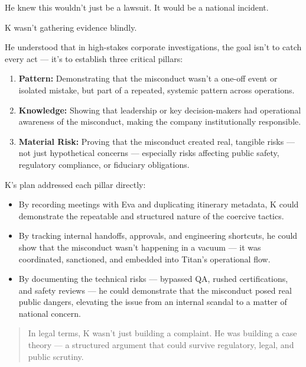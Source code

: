He knew this wouldn’t just be a lawsuit.  It would be a national incident.

K wasn’t gathering evidence blindly.

He understood that in high-stakes corporate investigations, the goal isn’t to catch every act — it’s to establish three critical pillars:

\begin{enumerate}
    \item \textbf{Pattern:}  
    Demonstrating that the misconduct wasn’t a one-off event or isolated mistake,  
    but part of a repeated, systemic pattern across operations.
    
    \item \textbf{Knowledge:}  
    Showing that leadership or key decision-makers had operational awareness of the misconduct,  
    making the company institutionally responsible.
    
    \item \textbf{Material Risk:}  
    Proving that the misconduct created real, tangible risks — not just hypothetical concerns —  
    especially risks affecting public safety, regulatory compliance, or fiduciary obligations.
\end{enumerate}

K’s plan addressed each pillar directly:

\begin{itemize}
    \item By recording meetings with Eva and duplicating itinerary metadata,  
    K could demonstrate the repeatable and structured nature of the coercive tactics.
    
    \item By tracking internal handoffs, approvals, and engineering shortcuts,  
    he could show that the misconduct wasn’t happening in a vacuum — it was coordinated, sanctioned, and embedded into Titan’s operational flow.
    
    \item By documenting the technical risks — bypassed QA, rushed certifications, and safety reviews —  
    he could demonstrate that the misconduct posed real public dangers, elevating the issue from an internal scandal to a matter of national concern.
\end{itemize}

\begin{quote}
    In legal terms, K wasn’t just building a complaint.  
    He was building a case theory — a structured argument that could survive regulatory, legal, and public scrutiny.
\end{quote}

